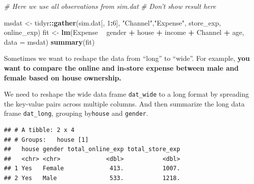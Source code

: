 \documentclass[12pt,]{krantz}
\makeatletter
\newenvironment{Shaded}{\begin{snugshade}}{\end{snugshade}}
\newcommand{\CommentTok}[1]{\textcolor[rgb]{0.37,0.37,0.37}{\textit{#1}}}
\newcommand{\DataTypeTok}[1]{\textcolor[rgb]{0.27,0.27,0.27}{#1}}
\newcommand{\DecValTok}[1]{\textcolor[rgb]{0.06,0.06,0.06}{#1}}
\newcommand{\KeywordTok}[1]{\textcolor[rgb]{0.27,0.27,0.27}{\textbf{#1}}}
\newcommand{\NormalTok}[1]{#1}
\newcommand{\OperatorTok}[1]{\textcolor[rgb]{0.43,0.43,0.43}{\textbf{#1}}}
\newcommand{\StringTok}[1]{\textcolor[rgb]{0.5,0.5,0.5}{#1}}
\newenvironment{kframe}{%
\medskip{}
\setlength{\fboxsep}{.8em}
 \def\at@end@of@kframe{}%
 \ifinner\ifhmode%
  \def\at@end@of@kframe{\end{minipage}}%
  \begin{minipage}{\columnwidth}%
 \fi\fi%
 \def\FrameCommand##1{\hskip\@totalleftmargin \hskip-\fboxsep
 \colorbox{shadecolor}{##1}\hskip-\fboxsep
     \hskip-\linewidth \hskip-\@totalleftmargin \hskip\columnwidth}%
 \MakeFramed {\advance\hsize-\width
   \@totalleftmargin\z@ \linewidth\hsize
   \@setminipage}}%
 {\par\unskip\endMakeFramed%
 \at@end@of@kframe}
\renewenvironment{Shaded}{\begin{kframe}}{\end{kframe}}
\makeatother
\begin{document}
\begin{Shaded}
\begin{Highlighting}[]
\CommentTok{# Here we use all observations from sim.dat}
\CommentTok{# Don't show result here}

\NormalTok{msdat <-}\StringTok{ }\NormalTok{tidyr}\OperatorTok{::}\KeywordTok{gather}\NormalTok{(sim.dat[, }\DecValTok{1}\OperatorTok{:}\DecValTok{6}\NormalTok{], }\StringTok{"Channel"}\NormalTok{,}\StringTok{"Expense"}\NormalTok{, }
\NormalTok{                       store_exp, online_exp)}
\NormalTok{fit <-}\StringTok{ }\KeywordTok{lm}\NormalTok{(Expense }\OperatorTok{~}\StringTok{ }\NormalTok{gender }\OperatorTok{+}\StringTok{ }\NormalTok{house }\OperatorTok{+}\StringTok{ }\NormalTok{income }\OperatorTok{+}\StringTok{ }\NormalTok{Channel }\OperatorTok{+}\StringTok{ }\NormalTok{age, }
          \DataTypeTok{data =}\NormalTok{ msdat)}
\KeywordTok{summary}\NormalTok{(fit)}
\end{Highlighting}
\end{Shaded}

Sometimes we want to reshape the data from ``long'' to ``wide''. For example, \textbf{you want to compare the online and in-store expense between male and female based on house ownership.}

We need to reshape the wide data frame \texttt{dat\_wide} to a long format by spreading the key-value pairs across multiple columns. And then summarize the long data frame \texttt{dat\_long}, grouping by\texttt{house} and \texttt{gender}.

\begin{Shaded}
\end{Shaded}

\begin{verbatim}
## # A tibble: 2 x 4
## # Groups:   house [1]
##   house gender total_online_exp total_store_exp
##   <chr> <chr>             <dbl>           <dbl>
## 1 Yes   Female             413.           1007.
## 2 Yes   Male               533.           1218.
\end{verbatim}
\end{document}
